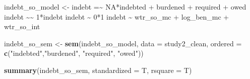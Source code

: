 \documentclass[
]{article}
\newenvironment{Shaded}{\begin{snugshade}}{\end{snugshade}}
\newcommand{\AttributeTok}[1]{\textcolor[rgb]{0.13,0.29,0.53}{#1}}
\newcommand{\FunctionTok}[1]{\textcolor[rgb]{0.13,0.29,0.53}{\textbf{#1}}}
\newcommand{\NormalTok}[1]{#1}
\newcommand{\OtherTok}[1]{\textcolor[rgb]{0.56,0.35,0.01}{#1}}
\newcommand{\StringTok}[1]{\textcolor[rgb]{0.31,0.60,0.02}{#1}}
\begin{document}
\begin{Shaded}
\begin{Highlighting}[]
\NormalTok{indebt\_so\_model }\OtherTok{\textless{}{-}} \StringTok{\textquotesingle{}}
\StringTok{  indebt =\textasciitilde{} NA*indebted + burdened + required + owed}
\StringTok{  indebt \textasciitilde{}\textasciitilde{} 1*indebt}
\StringTok{  indebt \textasciitilde{} 0*1}
\StringTok{  }
\StringTok{  indebt \textasciitilde{} wtr\_so\_mc + log\_ben\_mc + wtr\_so\_int}
\StringTok{\textquotesingle{}}

\NormalTok{indebt\_so\_sem }\OtherTok{\textless{}{-}} \FunctionTok{sem}\NormalTok{(indebt\_so\_model, }\AttributeTok{data =}\NormalTok{ study2\_clean, }\AttributeTok{ordered =} \FunctionTok{c}\NormalTok{(}\StringTok{"indebted"}\NormalTok{,}\StringTok{"burdened"}\NormalTok{, }\StringTok{"required"}\NormalTok{, }\StringTok{"owed"}\NormalTok{))}

\FunctionTok{summary}\NormalTok{(indebt\_so\_sem, }\AttributeTok{standardized =}\NormalTok{ T, }\AttributeTok{rsquare =}\NormalTok{ T)}
\end{Highlighting}
\end{Shaded}
\end{document}

